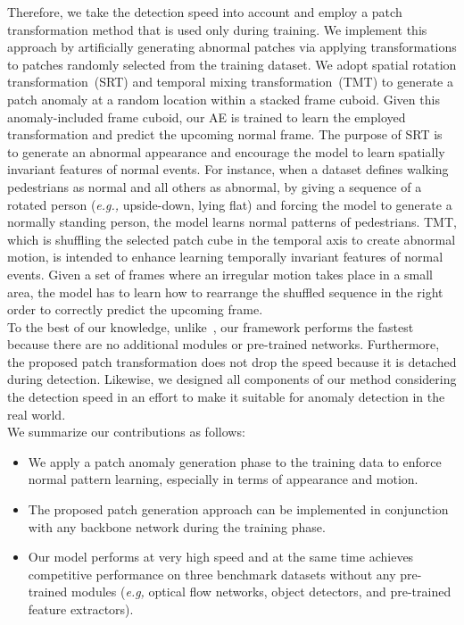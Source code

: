 \documentclass[10pt,twocolumn,letterpaper]{article}
\begin{document}
\indent Therefore, we take the detection speed into account and employ a patch transformation method that is used only during training. We implement this approach by artificially generating abnormal patches via applying transformations to patches randomly selected from the training dataset. We adopt spatial rotation transformation~(SRT) and temporal mixing transformation~(TMT) to generate a patch anomaly at a random location within a stacked frame cuboid. Given this anomaly-included frame cuboid, our AE is trained to learn the employed transformation and predict the upcoming normal frame. The purpose of SRT is to generate an abnormal appearance and encourage the model to learn spatially invariant features of normal events. For instance, when a dataset defines walking pedestrians as normal and all others as abnormal, by giving a sequence of a rotated person ({\it e.g.,} upside-down, lying flat) and forcing the model to generate a normally standing person, the model learns normal patterns of pedestrians. TMT, which is shuffling the selected patch cube in the temporal axis to create abnormal motion, is intended to enhance learning temporally invariant features of normal events. Given a set of frames where an irregular motion takes place in a small area, the model has to learn how to rearrange the shuffled sequence in the right order to correctly predict the upcoming frame. \\
\indent To the best of our knowledge, unlike~\cite{Liu_2018_CVPR,gong2019memorizing, park2020learning, ravanbakhsh2017abnormal, ionescu2019object, ravanbakhsh2018plug}, our framework performs the fastest because there are no additional modules or pre-trained networks. Furthermore, the proposed patch transformation does not drop the speed because it is detached during detection. Likewise, we designed all components of our method considering the detection speed in an effort to make it suitable for anomaly detection in the real world.\\
\indent We summarize our contributions as follows: 

\begin{itemize}
	\item We apply a patch anomaly generation phase to the training data to enforce normal pattern learning, especially in terms of appearance and motion.
	\item The proposed patch generation approach can be implemented in conjunction with any backbone network during the training phase.
	\item  Our model performs at very high speed and at the same time achieves competitive performance on three benchmark datasets without any pre-trained modules ({\it e.g,} optical flow networks, object detectors, and pre-trained feature extractors).
\end{itemize}
\end{document}
